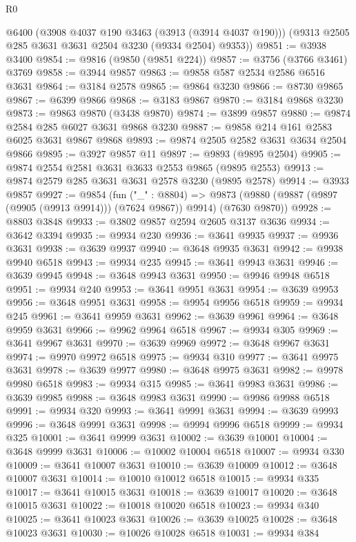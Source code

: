 \begin{lexlean}{R0}
\begin{coremodule}
      @6400
      (@3908 @4037 @190 @3463 (@3913 (@3914 @4037 @190)))
      (@9313 @2505 @285 @3631 @3631 @2504 @3230 (@9334 @2504) @9353))
@9851 := @3938 @3400
@9854 := @9816 (@9850 (@9851 @224))
@9857 := @3756 (@3766 @3461) @3769
@9858 := @3944 @9857
@9863 := @9858 @587 @2534 @2586 @6516 @3631
@9864 := @3184 @2578
@9865 := @9864 @3230
@9866 := @8730 @9865
@9867 := @6399 @9866
@9868 := @3183 @9867
@9870 := @3184 @9868 @3230
@9873 := @9863 @9870 (@3438 @9870)
@9874 := @3899 @9857
@9880 := @9874 @2584 @285 @6027 @3631 @9868 @3230
@9887 := @9858 @214 @161 @2583 @6025 @3631 @9867 @9868
@9893 := @9874 @2505 @2582 @3631 @3634 @2504 @9866
@9895 := @3927 @9857 @11
@9897 := @9893 (@9895 @2504)
@9905 := @9874 @2554 @2581 @3631 @3633 @2553 @9865 (@9895 @2553)
@9913 := @9874 @2579 @285 @3631 @3631 @2578 @3230 (@9895 @2578)
@9914 := @3933 @9857
@9927 := @9854
    (fun ("_" : @8804) =>
    @9873 (@9880 (@9887 (@9897 (@9905 (@9913 @9914))) (@7624 @9867)) @9914) (@7630 @9870))
@9928 := @8803 @3848
@9933 := @3802 @9857 @2594 @2605 @3137 @3636
@9934 := @3642 @3394
@9935 := @9934 @230
@9936 := @3641 @9935
@9937 := @9936 @3631
@9938 := @3639 @9937
@9940 := @3648 @9935 @3631
@9942 := @9938 @9940 @6518
@9943 := @9934 @235
@9945 := @3641 @9943 @3631
@9946 := @3639 @9945
@9948 := @3648 @9943 @3631
@9950 := @9946 @9948 @6518
@9951 := @9934 @240
@9953 := @3641 @9951 @3631
@9954 := @3639 @9953
@9956 := @3648 @9951 @3631
@9958 := @9954 @9956 @6518
@9959 := @9934 @245
@9961 := @3641 @9959 @3631
@9962 := @3639 @9961
@9964 := @3648 @9959 @3631
@9966 := @9962 @9964 @6518
@9967 := @9934 @305
@9969 := @3641 @9967 @3631
@9970 := @3639 @9969
@9972 := @3648 @9967 @3631
@9974 := @9970 @9972 @6518
@9975 := @9934 @310
@9977 := @3641 @9975 @3631
@9978 := @3639 @9977
@9980 := @3648 @9975 @3631
@9982 := @9978 @9980 @6518
@9983 := @9934 @315
@9985 := @3641 @9983 @3631
@9986 := @3639 @9985
@9988 := @3648 @9983 @3631
@9990 := @9986 @9988 @6518
@9991 := @9934 @320
@9993 := @3641 @9991 @3631
@9994 := @3639 @9993
@9996 := @3648 @9991 @3631
@9998 := @9994 @9996 @6518
@9999 := @9934 @325
@10001 := @3641 @9999 @3631
@10002 := @3639 @10001
@10004 := @3648 @9999 @3631
@10006 := @10002 @10004 @6518
@10007 := @9934 @330
@10009 := @3641 @10007 @3631
@10010 := @3639 @10009
@10012 := @3648 @10007 @3631
@10014 := @10010 @10012 @6518
@10015 := @9934 @335
@10017 := @3641 @10015 @3631
@10018 := @3639 @10017
@10020 := @3648 @10015 @3631
@10022 := @10018 @10020 @6518
@10023 := @9934 @340
@10025 := @3641 @10023 @3631
@10026 := @3639 @10025
@10028 := @3648 @10023 @3631
@10030 := @10026 @10028 @6518
@10031 := @9934 @384

\end{coremodule}
\end{lexlean}
